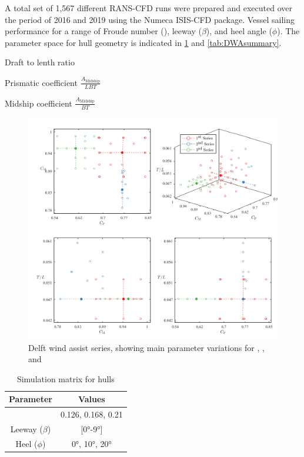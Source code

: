 \documentclass[twoside,twocolumn]{article}
\begin{document}
A total set of 1,567 different RANS-CFD runs were prepared and executed over the period of 2016 and 2019 using the Numeca ISIS-CFD package. Vessel sailing performance for a range of Froude number (\Fn), leeway ($\beta$), and heel angle ($\phi$). The parameter space for hull geometry is indicated in \cref{fig:DWA} and \cref{tab:DWAsummary}.

\begin{description}[leftmargin=1cm]

\item[\TL]{Draft to lenth ratio}
\item[\Cp]{Prismatic coefficient $\frac{A_{\mathrm{Midship}}}{LBT}$}
\item[\Cm]{Midship coefficient $\frac{A_{\mathrm{Midship}}}{BT}$}
\end{description}


\begin{figure}[!ht]
	\centering
	\includegraphics[width=.9\textwidth]{images/DWAseries.png}  %
	\caption{Delft wind assist series, showing main parameter variations for \TL, \Cp, and \Cm}
	\label{fig:DWA}
\end{figure}

\begin{table}[]
	\caption{Simulation matrix for \DWA hulls}
	\label{tab:parameters}
	\begin{tabular}{@{}cc@{}}
		\toprule
		\textbf{Parameter} & \textbf{Values} \\ \midrule
		\Fn & 0.126, 0.168, 0.21 \\
		Leeway ($\beta$) & [\ang{0}-\ang{9}] \\
		Heel ($\phi$) & \ang{0}, \ang{10}, \ang{20} \\ \bottomrule
	\end{tabular}
\end{table}
\end{document}
